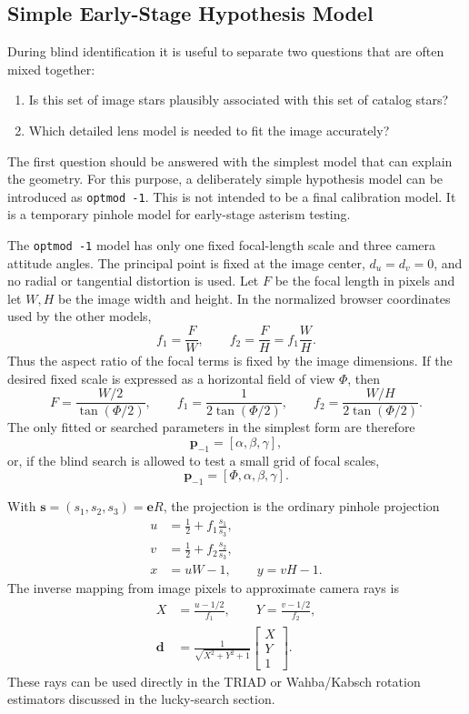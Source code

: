\documentclass[11pt]{article}
\begin{document}
\subsection{Simple Early-Stage Hypothesis Model}

During blind identification it is useful to separate two questions that are
often mixed together:
\begin{enumerate}
  \item Is this set of image stars plausibly associated with this set of
        catalog stars?
  \item Which detailed lens model is needed to fit the image accurately?
\end{enumerate}
The first question should be answered with the simplest model that can explain
the geometry. For this purpose, a deliberately simple hypothesis model can be
introduced as \texttt{optmod -1}. This is not intended to be a final calibration
model. It is a temporary pinhole model for early-stage asterism testing.

The \texttt{optmod -1} model has only one fixed focal-length scale and three
camera attitude angles. The principal point is fixed at the image center,
\(d_u=d_v=0\), and no radial or tangential distortion is used. Let \(F\) be the
focal length in pixels and let \(W,H\) be the image width and height. In the
normalized browser coordinates used by the other models,
\[
  f_1 = \frac{F}{W}, \qquad
  f_2 = \frac{F}{H}
      = f_1\frac{W}{H}.
\]
Thus the aspect ratio of the focal terms is fixed by the image dimensions. If
the desired fixed scale is expressed as a horizontal field of view \(\Phi\),
then
\[
  F = \frac{W/2}{\tan(\Phi/2)}, \qquad
  f_1 = \frac{1}{2\tan(\Phi/2)}, \qquad
  f_2 = \frac{W/H}{2\tan(\Phi/2)}.
\]
The only fitted or searched parameters in the simplest form are therefore
\[
  \mathbf{p}_{-1} = [\alpha,\beta,\gamma],
\]
or, if the blind search is allowed to test a small grid of focal scales,
\[
  \mathbf{p}_{-1} = [\Phi,\alpha,\beta,\gamma].
\]

With \(\mathbf{s}=(s_1,s_2,s_3)=\mathbf{e}R\), the projection is the ordinary
pinhole projection
\begin{align}
  u &= \frac{1}{2} + f_1 \frac{s_1}{s_3},\\
  v &= \frac{1}{2} + f_2 \frac{s_2}{s_3},\\
  x &= uW - 1,\qquad y = vH - 1.
\end{align}
The inverse mapping from image pixels to approximate camera rays is
\begin{align}
  X &= \frac{u-1/2}{f_1}, \qquad
  Y = \frac{v-1/2}{f_2},\\
  \mathbf{d} &=
  \frac{1}{\sqrt{X^2+Y^2+1}}
  \begin{bmatrix} X \\ Y \\ 1 \end{bmatrix}.
\end{align}
These rays can be used directly in the TRIAD or Wahba/Kabsch rotation
estimators discussed in the lucky-search section.
\end{document}
